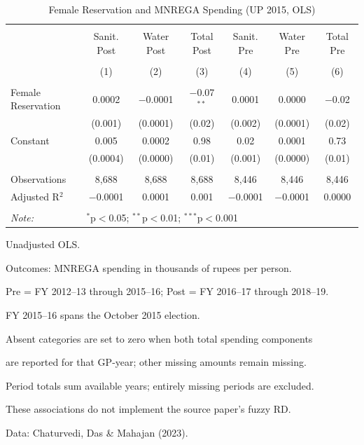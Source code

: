 \begin{table}[!htbp]
\centering
\begin{threeparttable}

  \caption{Female Reservation and MNREGA Spending (UP 2015, OLS)} 
  \label{tab:mnrega_up_cdm_ols} 
\scriptsize 
\begin{tabular}{@{\extracolsep{0pt}}lcccccc} 
\\[-1.8ex]\hline 
\hline \\[-1.8ex] 
 & Sanit. Post & Water Post & Total Post & Sanit. Pre & Water Pre & Total Pre \\ 
\\[-1.8ex] & (1) & (2) & (3) & (4) & (5) & (6)\\ 
\hline \\[-1.8ex] 
 Female Reservation & 0.0002 & $-$0.0001 & $-$0.07$^{**}$ & 0.0001 & 0.0000 & $-$0.02 \\ 
  & (0.001) & (0.0001) & (0.02) & (0.002) & (0.0001) & (0.02) \\ 
  Constant & 0.005 & 0.0002 & 0.98 & 0.02 & 0.0001 & 0.73 \\ 
  & (0.0004) & (0.0000) & (0.01) & (0.001) & (0.0000) & (0.01) \\ 
 \hline \\[-1.8ex] 
Observations & 8,688 & 8,688 & 8,688 & 8,446 & 8,446 & 8,446 \\ 
Adjusted R$^{2}$ & $-$0.0001 & 0.0001 & 0.001 & $-$0.0001 & $-$0.0001 & 0.0000 \\ 
\hline 
\hline \\[-1.8ex] 
\textit{Note:}  & \multicolumn{6}{l}{$^{*}$p$<$0.05; $^{**}$p$<$0.01; $^{***}$p$<$0.001} \\ 
\end{tabular} 
\begin{tablenotes}[flushleft]
\scriptsize
\item[] Unadjusted OLS.
\item[] Outcomes: MNREGA spending in thousands of rupees per person.
\item[] Pre = FY 2012--13 through 2015--16; Post = FY 2016--17 through 2018--19.
\item[] FY 2015--16 spans the October 2015 election.
\item[] Absent categories are set to zero when both total spending components
\item[] are reported for that GP-year; other missing amounts remain missing.
\item[] Period totals sum available years; entirely missing periods are excluded.
\item[] These associations do not implement the source paper's fuzzy RD.
\item[] Data: Chaturvedi, Das \& Mahajan (2023).
\end{tablenotes}
\end{threeparttable}
\end{table}
